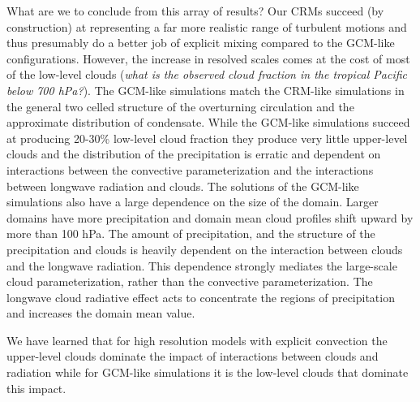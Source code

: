 \documentclass[draft]{agujournal2019}
\begin{document}
What are we to conclude from this array of results?  Our CRMs succeed (by construction) at representing a far more 
realistic range of turbulent motions and thus presumably do a better job of explicit mixing compared to the GCM-like 
configurations.  However, the increase in resolved scales comes at the cost of most of the low-level clouds (\textit{what is 
the observed cloud fraction in the tropical Pacific below 700 hPa?}).  The GCM-like simulations match the CRM-like 
simulations  in the general two celled structure of the overturning circulation and the approximate distribution of condensate.  
While the GCM-like simulations succeed at producing 20-30\% low-level cloud fraction they produce very little upper-level 
clouds and the distribution of the precipitation is erratic and dependent on interactions between the convective 
parameterization and the interactions between longwave radiation and clouds.  The solutions of the GCM-like simulations 
also have a large dependence on the size of the domain.  Larger domains have more precipitation and domain mean 
cloud profiles shift upward by more than 100 hPa.  The amount of precipitation, and the structure of the precipitation and clouds 
is heavily dependent on the interaction between clouds and the longwave radiation.  This dependence strongly mediates
the large-scale cloud parameterization, rather than the convective parameterization.  The longwave cloud radiative 
effect acts to concentrate the regions of precipitation and increases the domain mean value.   

We have learned that for high resolution models with explicit convection the upper-level clouds dominate the impact
of interactions between clouds and radiation while for GCM-like simulations it is the low-level clouds that dominate
this impact.  


%


\end{document}
